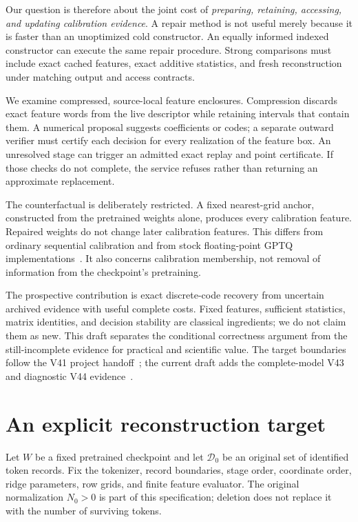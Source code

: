\documentclass[10pt,twocolumn,letterpaper]{article}
\newcommand{\calD}{\mathcal{D}}
\begin{document}
Our question is therefore about the joint cost of \emph{preparing, retaining,
accessing, and updating calibration evidence}. A repair method is not useful
merely because it is faster than an unoptimized cold constructor. An equally
informed indexed constructor can execute the same repair procedure. Strong
comparisons must include exact cached features, exact additive statistics, and
fresh reconstruction under matching output and access contracts.

We examine compressed, source-local feature enclosures. Compression discards
exact feature words from the live descriptor while retaining intervals that
contain them. A numerical proposal suggests coefficients or codes; a separate
outward verifier must certify each decision for every realization of the feature
box. An unresolved stage can trigger an admitted exact replay and point
certificate. If those checks do not complete, the service refuses rather than
returning an approximate replacement.

The counterfactual is deliberately restricted. A fixed nearest-grid anchor,
constructed from the pretrained weights alone, produces every calibration
feature. Repaired weights do not change later calibration features. This differs
from ordinary sequential calibration and from stock floating-point GPTQ
implementations~\cite{gptq}. It also concerns calibration membership, not removal
of information from the checkpoint's pretraining.

The prospective contribution is exact discrete-code recovery from uncertain
archived evidence with useful complete costs. Fixed features, sufficient
statistics, matrix identities, and decision stability are classical ingredients;
we do not claim them as new. This draft separates the conditional correctness
argument from the still-incomplete evidence for practical and scientific value.
The target boundaries follow the V41 project handoff~\cite{boundaries};
the current draft adds the complete-model V43 and diagnostic V44 evidence~\cite{v43,v44}.

\section{An explicit reconstruction target}
\label{sec:target}
Let $W$ be a fixed pretrained checkpoint and let $\calD_0$ be an original set of
identified token records. Fix the tokenizer, record boundaries, stage order,
coordinate order, ridge parameters, row grids, and finite feature evaluator.
The original normalization $N_0>0$ is part of this specification; deletion does
not replace it with the number of surviving tokens.
\end{document}
